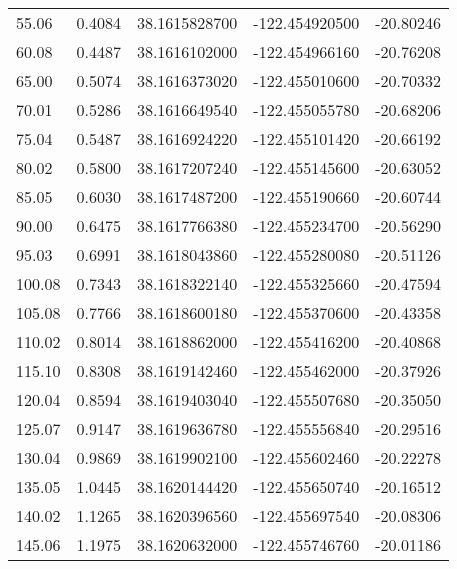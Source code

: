 \begin{scriptsize}
\begin{longtable}{p{2.5cm}p{2.5cm}p{3cm}p{3cm}p{2.5cm}}
            55.06  &	     0.4084 &               38.1615828700  &   -122.454920500   &	-20.80246 \\
            60.08  &	     0.4487 &               38.1616102000  &   -122.454966160   &	-20.76208 \\
            65.00  &	     0.5074 &               38.1616373020  &   -122.455010600   &	-20.70332 \\
            70.01  &	     0.5286 &               38.1616649540  &   -122.455055780   &	-20.68206 \\
            75.04  &	     0.5487 &               38.1616924220  &   -122.455101420   &	-20.66192 \\
            80.02  &	     0.5800 &               38.1617207240  &   -122.455145600   &	-20.63052 \\
            85.05  &	     0.6030 &               38.1617487200  &   -122.455190660   &	-20.60744 \\
            90.00  &	     0.6475 &               38.1617766380  &   -122.455234700   &	-20.56290 \\
            95.03  &	     0.6991 &               38.1618043860  &   -122.455280080   &	-20.51126 \\
           100.08  & 	 0.7343 &               38.1618322140  &   -122.455325660   &	-20.47594 \\
           105.08  & 	 0.7766 &               38.1618600180  &   -122.455370600   &	-20.43358 \\
           110.02  & 	 0.8014 &               38.1618862000  &   -122.455416200   &	-20.40868 \\
           115.10  & 	 0.8308 &               38.1619142460  &   -122.455462000   &	-20.37926 \\
           120.04  & 	 0.8594 &               38.1619403040  &   -122.455507680   &	-20.35050 \\
           125.07  & 	 0.9147 &               38.1619636780  &   -122.455556840   &	-20.29516 \\
           130.04  & 	 0.9869 &               38.1619902100  &   -122.455602460   &	-20.22278 \\
           135.05  & 	 1.0445 &               38.1620144420  &   -122.455650740   &	-20.16512 \\
           140.02  & 	 1.1265 &               38.1620396560  &   -122.455697540   &	-20.08306 \\
           145.06  & 	 1.1975 &               38.1620632000  &   -122.455746760   &	-20.01186 \\

\end{longtable}
\end{scriptsize}
